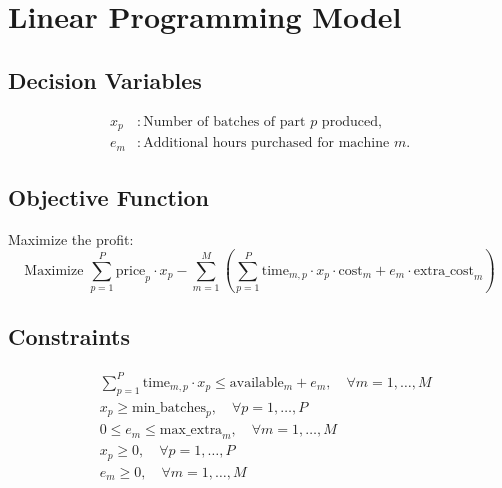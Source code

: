 \documentclass{article}
\begin{document}
\section*{Linear Programming Model}

\subsection*{Decision Variables}
\begin{align*}
x_p &: \text{Number of batches of part } p \text{ produced,} \\
e_m &: \text{Additional hours purchased for machine } m.
\end{align*}

\subsection*{Objective Function}
Maximize the profit:
\[
\text{Maximize } \sum_{p=1}^{P} \text{price}_p \cdot x_p - \sum_{m=1}^{M} \left( \sum_{p=1}^{P} \text{time}_{m,p} \cdot x_p \cdot \text{cost}_m + e_m \cdot \text{extra\_cost}_m \right)
\]

\subsection*{Constraints}
\begin{align*}
&\sum_{p=1}^{P} \text{time}_{m,p} \cdot x_p \leq \text{available}_m + e_m, \quad \forall m = 1, \ldots, M \\
&x_p \geq \text{min\_batches}_p, \quad \forall p = 1, \ldots, P \\
&0 \leq e_m \leq \text{max\_extra}_m, \quad \forall m = 1, \ldots, M \\
&x_p \geq 0, \quad \forall p = 1, \ldots, P \\
&e_m \geq 0, \quad \forall m = 1, \ldots, M 
\end{align*}
\end{document}
